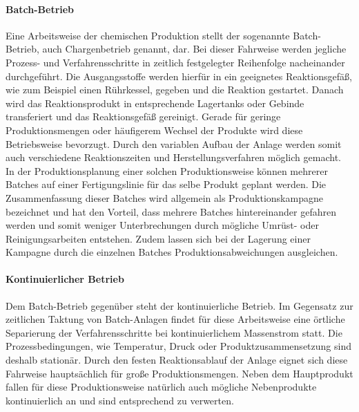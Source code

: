 \paragraph{Batch-Betrieb} Eine Arbeitsweise der chemischen Produktion stellt der sogenannte Batch-Betrieb, auch Chargenbetrieb genannt, dar. Bei dieser Fahrweise werden jegliche Prozess- und Verfahrensschritte in zeitlich festgelegter Reihenfolge nacheinander durchgeführt. Die Ausgangsstoffe werden hierfür in ein geeignetes Reaktionsgefäß, wie zum Beispiel einen Rührkessel, gegeben und die Reaktion gestartet. Danach wird das Reaktionsprodukt in entsprechende Lagertanks oder Gebinde transferiert und das Reaktionsgefäß gereinigt.\linebreak
Gerade für geringe Produktionsmengen oder häufigerem Wechsel der Produkte wird diese Betriebsweise bevorzugt. Durch den variablen Aufbau der Anlage werden somit auch verschiedene Reaktionszeiten und Herstellungsverfahren möglich gemacht.\,\cite{Ignatowitz.2015}\linebreak
In der Produktionsplanung einer solchen Produktionsweise können mehrerer Batches auf einer Fertigungslinie für das selbe Produkt geplant werden. Die Zusammenfassung dieser Batches wird allgemein als Produktionskampagne bezeichnet und hat den Vorteil, dass mehrere Batches hintereinander gefahren werden und somit weniger Unterbrechungen durch mögliche Umrüst- oder Reinigungsarbeiten entstehen. Zudem lassen sich bei der Lagerung einer Kampagne durch die einzelnen Batches Produktionsabweichungen ausgleichen.\,\cite{SAP.04.02.2022}

\paragraph{Kontinuierlicher Betrieb} Dem Batch-Betrieb gegenüber steht der kontinuierliche Betrieb. Im Gegensatz zur zeitlichen Taktung von Batch-Anlagen findet für diese Arbeitsweise eine örtliche Separierung der Verfahrensschritte bei kontinuierlichem Massenstrom statt. Die Prozessbedingungen, wie Temperatur, Druck oder Produktzusammensetzung sind deshalb stationär. Durch den festen Reaktionsablauf der Anlage eignet sich diese Fahrweise hauptsächlich für große Produktionsmengen. Neben dem Hauptprodukt fallen für diese Produktionsweise natürlich auch mögliche Nebenprodukte kontinuierlich an und sind entsprechend zu verwerten. \cite{Ignatowitz.2015}


